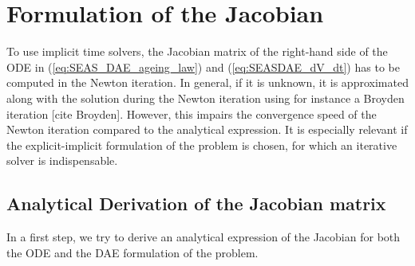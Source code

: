 \documentclass{report}
\begin{document}
\section{Formulation of the Jacobian}
To use implicit time solvers, the Jacobian matrix of the right-hand side of the ODE in (\ref{eq:SEAS_DAE_ageing_law}) and (\ref{eq:SEASDAE_dV_dt}) has to be computed in the Newton iteration. In general, if it is unknown, it is approximated along with the solution during the Newton iteration using for instance a Broyden iteration [cite Broyden]. However, this impairs the convergence speed of the Newton iteration compared to the analytical expression. It is especially relevant if the explicit-implicit formulation of the problem is chosen, for which an iterative solver is indispensable. 

\subsection{Analytical Derivation of the Jacobian matrix}
\label{ssec:AnalyticalDerivationOfTheJacobianMatrix}
In a first step, we try to derive an analytical expression of the Jacobian for both the ODE and the DAE formulation of the problem.
\end{document}
